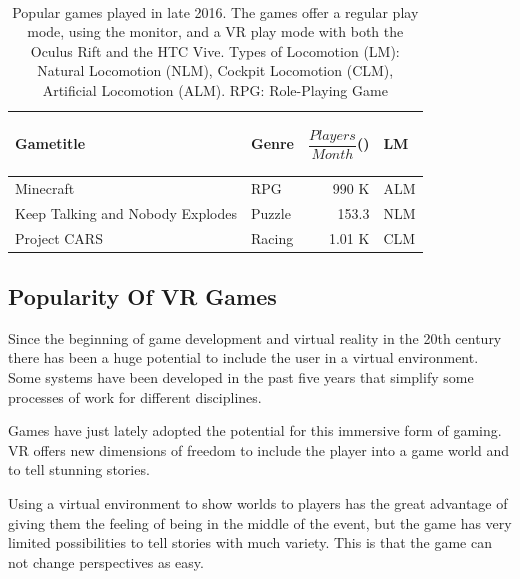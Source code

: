 \begin{table}%
	\caption{Popular games played in late 2016. The games offer a regular play mode, using the monitor, and a VR play mode with both the Oculus Rift and the HTC Vive. Types of Locomotion (LM): Natural Locomotion (NLM), Cockpit Locomotion (CLM), Artificial Locomotion (ALM). RPG: Role-Playing Game}~\label{tab:popularGames}
	
	\renewcommand{\arraystretch}{1.3}%
	\begin{tabular*}{\columnwidth}{ p{33mm} l r l }
		Gametitle & Genre & \parbox[c][2.2em][t]{2cm}{\begin{flushright}$\dfrac{Players}{Month}$(\footnotemark[2])\end{flushright}} & LM \\
		\hline
		Minecraft & RPG & 990 K & ALM \\
		Keep Talking and \newline Nobody Explodes & Puzzle & 153.3 & NLM \\
		Project CARS & Racing & 1.01 K & CLM\\
	\end{tabular*}
	
\end{table}


\subsection{Popularity Of VR Games}
Since the beginning of game development and virtual reality in the 20th century there has been a huge potential to include the user in a virtual environment. Some systems have been developed in the past five years that simplify some processes of work for different disciplines. 

Games have just lately adopted the potential for this immersive form of gaming. VR offers new dimensions of freedom to include the player into a game world and to tell stunning stories.

Using a virtual environment to show worlds to players has the great advantage of giving them the feeling of being in the middle of the event, but the game has very limited possibilities to tell stories with much variety. This is that the game can not change perspectives as easy. 


